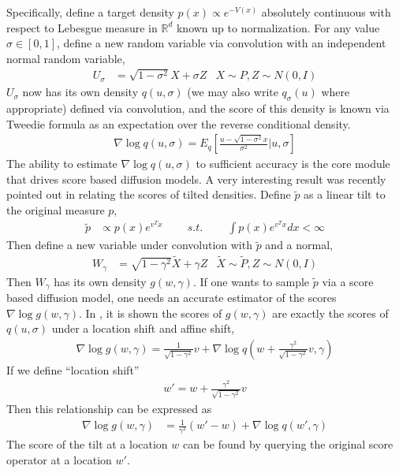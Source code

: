 \documentclass[11pt]{article}
\theoremstyle{proposition}
\theoremstyle{lemma}
\theoremstyle{corollary}
\theoremstyle{theorem}
\theoremstyle{definition}
\begin{document}
Specifically, define a target density $p(x) \propto e^{-V(x)}$ absolutely continuous with respect to Lebesgue measure in $\mathbb{R}^{d}$ known up to normalization. For any value $\sigma \in [0,1]$, define a new random variable via convolution with an independent normal random variable,
\begin{align}
    U_{\sigma} &= \sqrt{1-\sigma^{2}}X+\sigma Z&X \sim P, Z \sim N(0,I)
\end{align}
$U_{\sigma}$ now has its own density $q(u,\sigma)$ (we may also write $q_{\sigma}(u)$ where appropriate) defined via convolution, and the score of this density is known via Tweedie formula \cite{robbins1956empirical,miyasawa1961empirical,roberts1996exponential,efron2011tweedie} as an expectation over the reverse conditional density.
\begin{align}
    \nabla \log q(u,\sigma) = E_{q}[\frac{u - \sqrt{1-\sigma^{2}}x}{\sigma^{2}}|u,\sigma]
\end{align}
The ability to estimate $\nabla \log q(u,\sigma)$ to sufficient accuracy is the core module that drives score based diffusion models. A very interesting result was recently pointed out in \cite{moitra2026steering} relating the scores of tilted densities. Define $\tilde{p}$ as a linear tilt to the original measure $p$,
\begin{align}
    \tilde{p} &\propto p(x)e^{ v^{T}x}\quad\quad~s.t.~\quad\quad \int p(x)e^{ v^{T}x} dx < \infty
\end{align}
Then define a new variable under convolution with $\tilde{p}$ and a normal,
\begin{align}
    W_{\gamma} &= \sqrt{1-\gamma^{2}}\tilde{X}+\gamma Z&\tilde{X} \sim \tilde{P}, Z \sim N(0,I)
\end{align}
Then $W_{\gamma}$ has its own density $g(w,\gamma)$. If one wants to sample $\tilde{p}$ via a score based diffusion model, one needs an accurate estimator of the scores $\nabla \log g(w,\gamma)$. In \cite[Lemma 3.3]{moitra2026steering}, it is shown the scores of $g(w,\gamma)$ are exactly the scores of $q(u,\sigma)$ under a location shift and affine shift,
\begin{align}
    \nabla \log g(w,\gamma) = \frac{1}{\sqrt{1-\gamma^{2}}}v+\nabla \log q(w + \frac{\gamma^{2}}{\sqrt{1-\gamma^{2}}}v, \gamma)
\end{align}
If we define ``location shift''
\begin{align}
    w' = w+\frac{\gamma^{2}}{\sqrt{1-\gamma^{2}}}v
\end{align}
Then this relationship can be expressed as
\begin{align}
    \nabla \log g(w,\gamma)&= \frac{1}{\gamma^{2}}(w'-w)+\nabla \log q(w', \gamma)
\end{align}
The score of the tilt at a location $w$ can be found by querying the original score operator at a location $w'$.
\end{document}
